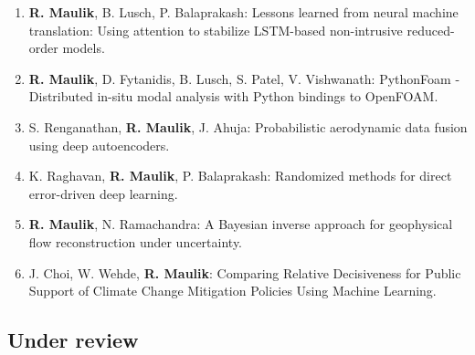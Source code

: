 \documentclass[letterpaper]{article}
\begin{document}
\begin{enumerate}

\item \textbf{R. Maulik}, B. Lusch, P. Balaprakash: Lessons learned from neural machine translation: Using attention to stabilize LSTM-based non-intrusive reduced-order models.

\item \textbf{R. Maulik}, D. Fytanidis, B. Lusch, S. Patel, V. Vishwanath: PythonFoam - Distributed in-situ modal analysis with Python bindings to OpenFOAM.

\item S. Renganathan, \textbf{R. Maulik}, J. Ahuja: Probabilistic aerodynamic data fusion using deep autoencoders.

\item K. Raghavan, \textbf{R. Maulik}, P. Balaprakash: Randomized methods for direct error-driven deep learning.

\item \textbf{R. Maulik}, N. Ramachandra: A Bayesian inverse approach for geophysical flow reconstruction under uncertainty.

\item J. Choi, W. Wehde, \textbf{R. Maulik}: Comparing Relative Decisiveness for Public Support of Climate Change Mitigation Policies Using Machine Learning.



\end{enumerate}


\subsection*{Under review}
\end{document}
